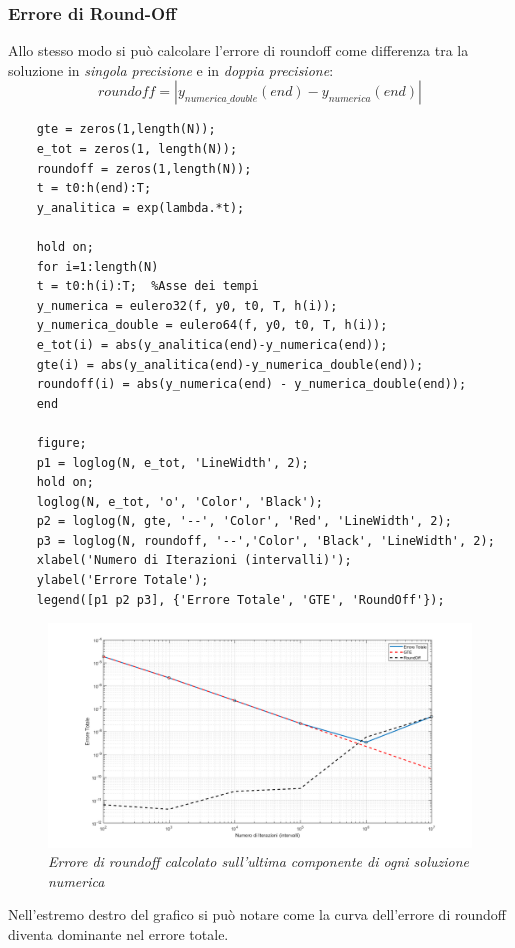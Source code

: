 \subsubsection{Errore di Round-Off}
Allo stesso modo si può calcolare l'errore di roundoff come differenza tra la soluzione in \textit{singola precisione} e in \textit{doppia precisione}:
\begin{equation*}
	roundoff = |y_{numerica\_double}(end) - y_{numerica}(end)|
\end{equation*}
\begin{verbatim}
	gte = zeros(1,length(N));
	e_tot = zeros(1, length(N));
	roundoff = zeros(1,length(N));
	t = t0:h(end):T;
	y_analitica = exp(lambda.*t);
	
	hold on;
	for i=1:length(N)
	t = t0:h(i):T;  %Asse dei tempi
	y_numerica = eulero32(f, y0, t0, T, h(i));
	y_numerica_double = eulero64(f, y0, t0, T, h(i));
	e_tot(i) = abs(y_analitica(end)-y_numerica(end));
	gte(i) = abs(y_analitica(end)-y_numerica_double(end));
	roundoff(i) = abs(y_numerica(end) - y_numerica_double(end));
	end
	
	figure;
	p1 = loglog(N, e_tot, 'LineWidth', 2);
	hold on;
	loglog(N, e_tot, 'o', 'Color', 'Black');
	p2 = loglog(N, gte, '--', 'Color', 'Red', 'LineWidth', 2);
	p3 = loglog(N, roundoff, '--','Color', 'Black', 'LineWidth', 2);
	xlabel('Numero di Iterazioni (intervalli)');
	ylabel('Errore Totale');
	legend([p1 p2 p3], {'Errore Totale', 'GTE', 'RoundOff'});
\end{verbatim}
\begin{figure}[H]
	\centering   
	\includegraphics[width=\textwidth]{matlab/esercizio1_errore_roundoff.png}
	\caption{\textit{Errore di roundoff calcolato sull'ultima componente di ogni soluzione numerica}}
\end{figure}
Nell'estremo destro del grafico si può notare come la curva dell'errore di roundoff diventa dominante nel errore totale.
